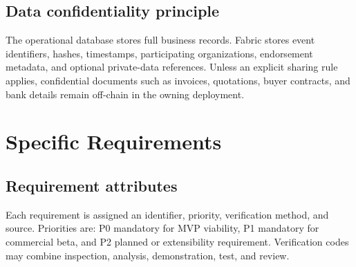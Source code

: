 \documentclass[11pt,a4paper]{article}
\begin{document}
\subsection{Data confidentiality principle}
The operational database stores full business records. Fabric stores event identifiers, hashes, timestamps, participating organizations, endorsement metadata, and optional private-data references. Unless an explicit sharing rule applies, confidential documents such as invoices, quotations, buyer contracts, and bank details remain off-chain in the owning deployment.
\section{Specific Requirements}

\subsection{Requirement attributes}
Each requirement is assigned an identifier, priority, verification method, and source. Priorities are: P0 mandatory for MVP viability, P1 mandatory for commercial beta, and P2 planned or extensibility requirement. Verification codes may combine inspection, analysis, demonstration, test, and review.
\end{document}
